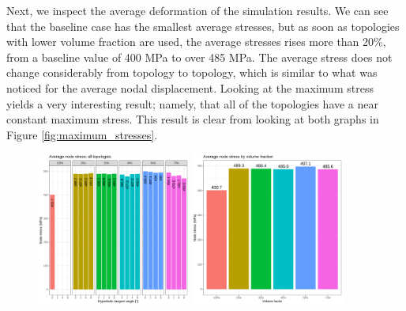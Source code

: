 \documentclass[../main.tex]{subfiles}
\begin{document}
Next, we inspect the average deformation of the simulation results. We can see that the baseline case has the smallest average stresses, but as soon as topologies with lower volume fraction are used, the average stresses rises more than 20\%, from a baseline value of 400 MPa to over 485 MPa. The average stress does not change considerably from topology to topology, which is similar to what was noticed for the average nodal displacement. Looking at the maximum stress yields a very interesting result; namely, that all of the topologies have a near constant maximum stress. This result is clear from looking at both graphs in Figure \ref{fig:maximum_stresses}.

\begin{figure}[h!]
  \centering
  \includegraphics[width=0.45\textwidth]{images/results/plots/femoral/stress/average_stress.png}
  \hfill
  \includegraphics[width=0.45\textwidth]{images/results/plots/femoral/stress/femoral_average_group_stress.png}
  \caption{}
  \label{fig:average_stresses}
\end{figure}
\end{document}
